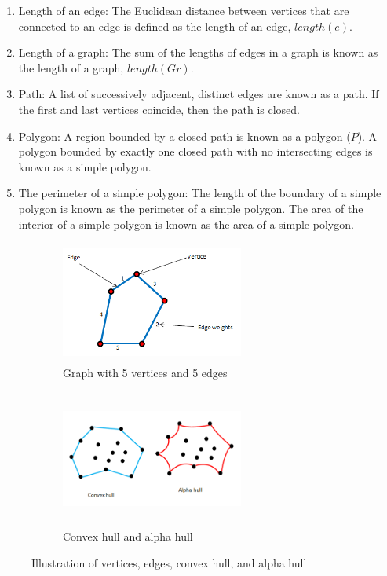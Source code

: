 \documentclass{article}
\begin{document}
\begin{enumerate}
\def\labelenumi{\roman{enumi})}
\setcounter{enumi}{2}
\item
  Length of an edge: The Euclidean distance between vertices that
  are connected to an edge is defined as the length of an edge, \(length(e)\).
\item
  Length of a graph: The sum of the lengths of edges in a graph is known
  as the length of a graph, \(length(Gr)\).
\item
  Path: A list of successively adjacent, distinct edges are known as a
  path. If the first and last vertices coincide, then the path is closed.
\item
  Polygon: A region bounded by a closed path is known as a polygon
  (\(P\)). A polygon bounded by exactly one closed path with no
  intersecting edges is known as a simple polygon.
\item
  The perimeter of a simple polygon: The length of the boundary of a simple
  polygon is known as the perimeter of a simple polygon. The area of
  the interior of a simple polygon is known as the area of a simple polygon.
\end{enumerate}

\begin{figure}[!ht]
\begin{subfigure}{.5\textwidth}
\centering
        \includegraphics[width=60mm, height=40mm]{Figures/c4new.png}
        \caption{\label{scagimg5}Graph with 5 vertices and 5 edges}

        
\end{subfigure} 
\begin{subfigure}{.5\textwidth}
\centering
       \includegraphics[width=60mm, height=45mm]{Figures/c5.png}
        \caption{\label{scagimg4}Convex hull and alpha hull}
        
\end{subfigure} 

\caption{Illustration of vertices, edges, convex hull, and alpha hull}
        \end{figure}
\end{document}
